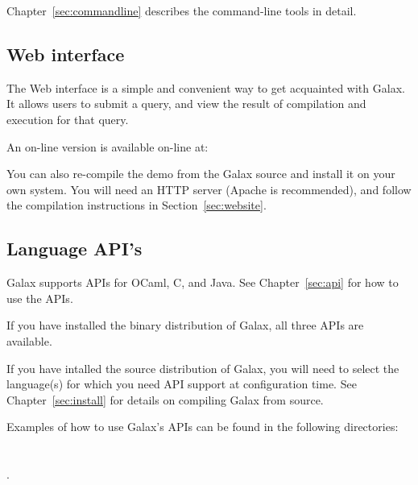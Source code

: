 Chapter~\ref{sec:commandline} describes the command-line tools in detail.

\subsection{Web interface}

The Web interface is a simple and convenient way to get acquainted
with Galax. It allows users to submit a query, and view the result of
compilation and execution for that query.

An on-line version is available on-line at:

You can also re-compile the demo from the Galax source and install it
on your own system. You will need an HTTP server (Apache is
recommended), and follow the compilation instructions in
Section~\ref{sec:website}.

\subsection{Language API's}

Galax supports APIs for OCaml, C, and Java.  See Chapter~\ref{sec:api}
for how to use the APIs.
  
If you have installed the binary distribution of Galax, all three APIs
are available.

If you have intalled the source distribution of Galax, you will need
to select the language(s) for which you need API support at
configuration time.  See Chapter~\ref{sec:install} for details on
compiling Galax from source.

Examples of how to use Galax's APIs can be found in the following
directories:\\ \\
\\
.

